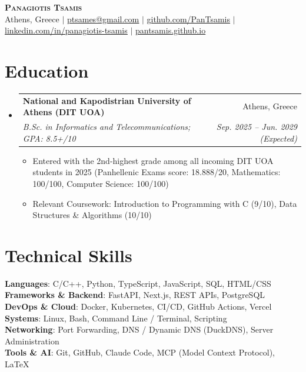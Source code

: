 \documentclass[letterpaper,11pt]{article}
\makeatletter
\newcommand{\resumeItem}[1]{
  \item\small{
    {#1 \vspace{1pt}}
  }
}
\newcommand{\resumeSubheading}[4]{
  \vspace{1pt}\item
    \begin{tabular*}{0.97\textwidth}[t]{l@{\extracolsep{\fill}}r}
      \textbf{#1} & #2 \\
      \textit{\small#3} & \textit{\small #4} \\
    \end{tabular*}\vspace{0pt}
}
\newcommand{\resumeSubHeadingListStart}{\begin{itemize}[leftmargin=0.15in, label={}, itemsep=2pt]}
\newcommand{\resumeSubHeadingListEnd}{\end{itemize}\vspace{0pt}}
\newcommand{\resumeItemListStart}{\begin{itemize}[itemsep=1pt]}
\newcommand{\resumeItemListEnd}{\end{itemize}\vspace{0pt}}
\makeatother
\begin{document}
\begin{center}
    \textbf{\Huge \scshape Panagiotis Tsamis} \\ \vspace{1pt}
    \small Athens, Greece $|$
    \href{mailto:ptsames@gmail.com}{\underline{ptsames@gmail.com}} $|$
    \href{https://github.com/PanTsamis}{\underline{github.com/PanTsamis}} $|$
    \href{https://www.linkedin.com/in/panagiotis-tsamis-a5aa66382/}{\underline{linkedin.com/in/panagiotis-tsamis}} $|$
    \href{https://pantsamis.github.io}{\underline{pantsamis.github.io}}
\end{center}


\section{Education}
  \resumeSubHeadingListStart
    \resumeSubheading
      {National and Kapodistrian University of Athens (DIT UOA)}{Athens, Greece}
      {B.Sc. in Informatics and Telecommunications; GPA: 8.5+/10}{Sep. 2025 -- Jun. 2029 (Expected)}
      \resumeItemListStart
        \resumeItem{Entered with the 2nd-highest grade among all incoming DIT UOA students in 2025 (Panhellenic Exams score: 18.888/20, Mathematics: 100/100, Computer Science: 100/100)}
        \resumeItem{Relevant Coursework: Introduction to Programming with C (9/10), Data Structures \& Algorithms (10/10)}
      \resumeItemListEnd
  \resumeSubHeadingListEnd


\section{Technical Skills}
 \begin{itemize}[leftmargin=0.15in, label={}]
    \small{\item{
     \textbf{Languages}{: C/C++, Python, TypeScript, JavaScript, SQL, HTML/CSS} \\[3pt]
     \textbf{Frameworks \& Backend}{: FastAPI, Next.js, REST APIs, PostgreSQL} \\[3pt]
     \textbf{DevOps \& Cloud}{: Docker, Kubernetes, CI/CD, GitHub Actions, Vercel} \\[3pt]
     \textbf{Systems}{: Linux, Bash, Command Line / Terminal, Scripting} \\[3pt]
     \textbf{Networking}{: Port Forwarding, DNS / Dynamic DNS (DuckDNS), Server Administration} \\[3pt]
     \textbf{Tools \& AI}{: Git, GitHub, Claude Code, MCP (Model Context Protocol), LaTeX}
    }}
 \end{itemize}
 \vspace{2pt}
\end{document}
